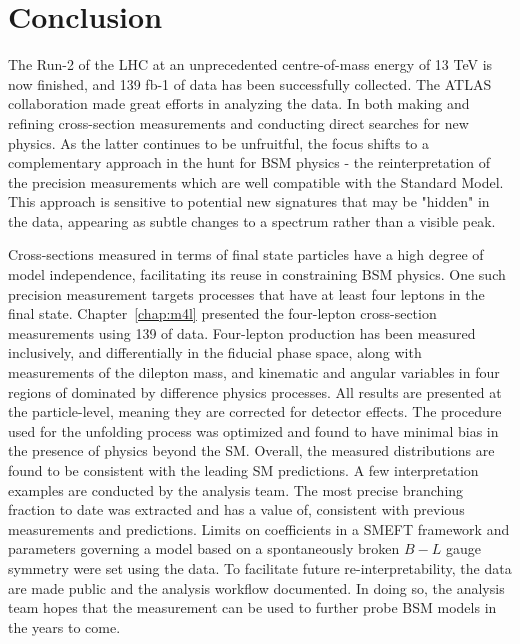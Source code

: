 \chapter{Conclusion}
\label{chap:conclusion}

The Run-2 of the LHC at an unprecedented centre-of-mass energy of 13 TeV is now finished, and 139 fb-1 of data has been successfully collected. The ATLAS collaboration made great efforts in analyzing the data. In both making and refining cross-section measurements and conducting direct searches for new physics. As the latter continues to be unfruitful, the focus shifts to a complementary approach in the hunt for BSM physics - the reinterpretation of the precision measurements which are well compatible with the Standard Model. This approach is sensitive to potential new signatures that may be "hidden" in the data, appearing as subtle changes to a spectrum rather than a visible peak. 

Cross-sections measured in terms of final state particles have a high degree of model independence, facilitating its reuse in constraining BSM physics. One such precision measurement targets processes that have at least four leptons in the final state. Chapter~\ref{chap:m4l} presented the \ATLAS four-lepton cross-section measurements using \unit{139}{\invfb} of data. Four-lepton production has been measured inclusively, and differentially in the fiducial phase space, along with measurements of the dilepton mass, and kinematic and angular variables in four regions of \mFourL{} dominated by difference physics processes. All results are presented at the particle-level, meaning they are corrected for detector effects. The procedure used for the unfolding process was optimized and found to have minimal bias in the presence of physics beyond the SM. Overall, the measured distributions are found to be consistent with the leading SM predictions. A few interpretation examples are conducted by the analysis team. The most precise \ZFourL{} branching fraction to date was extracted and has a value of, consistent with previous measurements and predictions. Limits on coefficients in a SMEFT framework and parameters governing a model based on a spontaneously broken $B-L$ gauge symmetry were set using the data. To facilitate future re-interpretability, the data are made public and the analysis workflow documented. In doing so, the analysis team hopes that the measurement can be used to further probe BSM models in the years to come.

